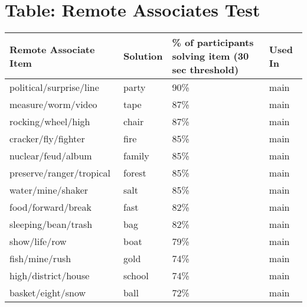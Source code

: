 \section{\\Table: Remote Associates Test}

\begin{table}[h!]
	\begin{tabular}{llll}
		\hline
		Remote Associate Item    & Solution & \pbox{20cm}{\% of participants \\ solving item (30 sec threshold)} & Used In \rule[-2ex]{0pt}{7ex} \\ [2ex] \hline
		political/surprise/line  & party    & 90\%                                               & main  		\\ [0.5ex]
		measure/worm/video       & tape     & 87\%                                               & main  		\\ [0.5ex]
		rocking/wheel/high       & chair    & 87\%                                               & main  		\\ [0.5ex]
		cracker/fly/fighter      & fire     & 85\%                                               & main  		\\ [0.5ex]
		nuclear/feud/album       & family   & 85\%                                               & main  		\\ [0.5ex]
		preserve/ranger/tropical & forest   & 85\%                                               & main  		\\ [0.5ex]
		water/mine/shaker        & salt     & 85\%                                               & main  		\\ [0.5ex]
		food/forward/break       & fast     & 82\%                                               & main  		\\ [0.5ex]
		sleeping/bean/trash      & bag      & 82\%                                               & main  		\\ [0.5ex]
		show/life/row            & boat     & 79\%                                               & main  		\\ [0.5ex]
		fish/mine/rush           & gold     & 74\%                                               & main  		\\ [0.5ex]
		high/district/house      & school   & 74\%                                               & main  		\\ [0.5ex]
		basket/eight/snow        & ball     & 72\%                                               & main  		\\ [0.5ex]

\end{tabular}
\end{table}
